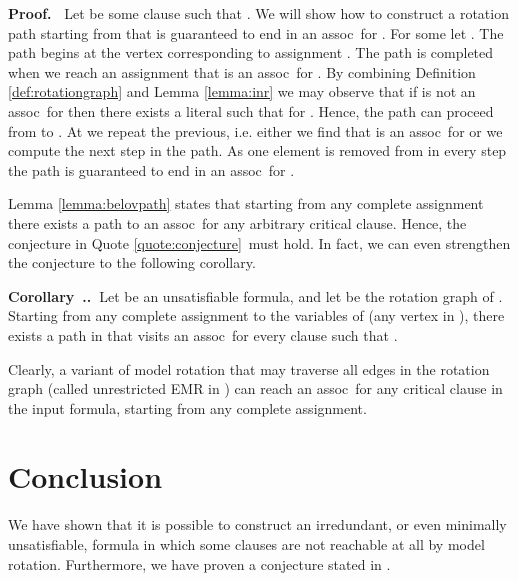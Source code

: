 \documentclass{article}
\newcounter{customenvs}[section]
\renewcommand{\thecustomenvs}{\thesection.\arabic{customenvs}}
\newcommand{\customenvbegin}[1]{\medskip\refstepcounter{customenvs}\noindent\textbf{#1~\thecustomenvs.~}}
\newcommand{\customenvend}{\medskip}
\newenvironment{corollary}{\customenvbegin{Corollary}}{\customenvend}
\newenvironment{proof}{\medskip\noindent\textbf{Proof.~}}{\medskip}
\newcommand{\assoc}{assoc}
\begin{document}
\begin{proof}
Let  be some clause  such that .
We will show how to construct a rotation path starting from  that is guaranteed to end in an \assoc~for .
For some  let .
The path begins at the vertex corresponding to assignment .
The path is completed when we reach an assignment  that is an \assoc~for .
By combining Definition \ref{def:rotationgraph} and Lemma \ref{lemma:inr} we may observe that if  is not an \assoc~for  then there exists a literal  such that  for .
Hence, the path can proceed from  to . 
At  we repeat the previous, i.e. either we find that  is an \assoc~for  or we compute the next step in the path.
As one element is removed from  in every step the path is guaranteed to end in an \assoc~for .
\end{proof}

Lemma \ref{lemma:belovpath} states that starting from any complete assignment there exists a path to an \assoc~for any arbitrary critical clause. 
Hence, the conjecture in Quote \ref{quote:conjecture}~must hold.
In fact, we can even strengthen the conjecture to the following corollary.

\begin{corollary}\label{cor:belovstrong}Let  be an unsatisfiable formula, and let  be the rotation graph of . 
Starting from any complete assignment to the variables of  (any vertex in ), there exists a path in  that visits an \assoc~for every clause  such that .
\end{corollary}

Clearly, a variant of model rotation that may traverse all edges in the rotation graph (called unrestricted EMR in \cite{DBLP:journals/aicom/BelovLM12}) can reach an \assoc~for any critical clause in the input formula, starting from any complete assignment.

\section{Conclusion}
We have shown that it is possible to construct an irredundant, or even minimally unsatisfiable, formula in which some clauses are not reachable at all by model rotation.
Furthermore, we have proven a conjecture stated in \cite{DBLP:journals/aicom/BelovLM12}.


\end{document}
